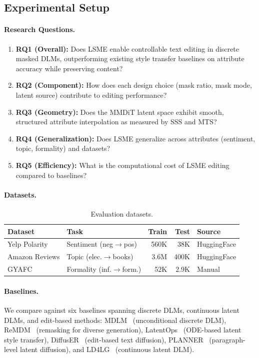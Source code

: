 \documentclass{article}
\begin{document}
\subsection{Experimental Setup}

\paragraph{Research Questions.}
\begin{enumerate}
  \item \textbf{RQ1 (Overall):} Does LSME enable controllable text editing in discrete masked DLMs, outperforming existing style transfer baselines on attribute accuracy while preserving content?
  \item \textbf{RQ2 (Component):} How does each design choice (mask ratio, mask mode, latent source) contribute to editing performance?
  \item \textbf{RQ3 (Geometry):} Does the MMDiT latent space exhibit smooth, structured attribute interpolation as measured by SSS and MTS?
  \item \textbf{RQ4 (Generalization):} Does LSME generalize across attributes (sentiment, topic, formality) and datasets?
  \item \textbf{RQ5 (Efficiency):} What is the computational cost of LSME editing compared to baselines?
\end{enumerate}

\paragraph{Datasets.}
\begin{table}[t]
\centering
\caption{Evaluation datasets.}
\label{tab:datasets}
\small
\begin{tabular}{llrrl}
\toprule
\textbf{Dataset} & \textbf{Task} & \textbf{Train} & \textbf{Test} & \textbf{Source} \\
\midrule
Yelp Polarity & Sentiment (neg$\to$pos) & 560K & 38K & HuggingFace \\
Amazon Reviews & Topic (elec.$\to$books) & 3.6M & 400K & HuggingFace \\
GYAFC & Formality (inf.$\to$form.) & 52K & 2.9K & Manual \\
\bottomrule
\end{tabular}
\end{table}

\paragraph{Baselines.}
We compare against six baselines spanning discrete DLMs, continuous latent DLMs, and edit-based methods:
MDLM~\citep{sahoo2024} (unconditional discrete DLM),
ReMDM~\citep{arriola2025remdm} (remasking for diverse generation),
LatentOps~\citep{liu2023latentops} (ODE-based latent style transfer),
DiffusER~\citep{reid2023} (edit-based text diffusion),
PLANNER~\citep{zhang2023} (paragraph-level latent diffusion), and
LD4LG~\citep{lovelace2023} (continuous latent DLM).
\end{document}
